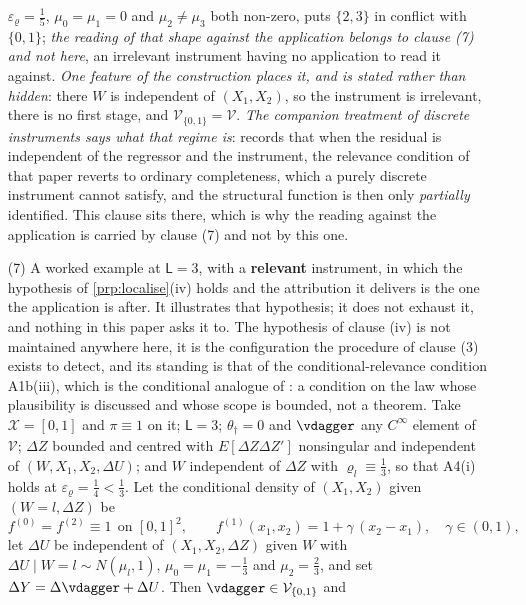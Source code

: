 \begin{remark}
\begin{enumerate}
$\varepsilon_\varrho=\tfrac15$, $\mu_0=\mu_1=0$ and $\mu_2\neq\mu_3$ both non-zero, puts $\{2,3\}$ in
conflict with $\{0,1\}$; \emph{the reading of that shape against the application belongs to clause
\textup{(7)} and not here}, an irrelevant instrument having no application to read it against.
\emph{One feature of the construction places it, and is stated rather than hidden}: there $W$ is
independent of $(X_1,X_2)$, so the instrument is irrelevant, there is no first stage, and
$\mathcal V_{\{0,1\}}=\mathcal V$. \emph{The companion treatment of discrete instruments says what that
regime is}: \citet[Remark~2]{centorrinofeveflorens2019} records that when the residual is independent of
the regressor and the instrument, the relevance condition of that paper reverts to ordinary
completeness, which a purely discrete instrument cannot satisfy, and the structural function is then
only \emph{partially} identified. This clause sits there, which is why the reading against the
application is carried by clause \textup{(7)} and not by this one.
\item[(7)] A worked example at $\mathsf L=3$, with a \textbf{relevant} instrument, in which the
hypothesis of \cref{prp:localise}\textup{(iv)} holds and the attribution it delivers is the one the
application is after. It illustrates that hypothesis; it does not exhaust it, and nothing in this
paper asks it to. The hypothesis of clause \textup{(iv)} is not maintained anywhere here, it is the
configuration the procedure of clause \textup{(3)} exists to detect, and its standing is that of the
conditional-relevance condition A1b(iii), which is the conditional analogue of
\citet[Assumption~2.2]{centorrinofeveflorens2019}: a condition on the law whose plausibility is
discussed and whose scope is bounded, not a theorem. Take
$\mathcal X=[0,1]$ and $\pi\equiv1$ on it; $\mathsf L=3$; $\theta_\dagger=0$ and $\vdagger$ any
$C^{\infty}$ element of $\mathcal V$; $\Delta Z$ bounded and centred with $E[\Delta Z\Delta Z']$
nonsingular and independent of $(W,X_1,X_2,\Delta U)$; and $W$ independent of $\Delta Z$ with
$\varrho_l\equiv\tfrac13$, so that A4(i) holds at $\varepsilon_\varrho=\tfrac14<\tfrac13$. Let the
conditional density of $(X_1,X_2)$ given $(W=l,\Delta Z)$ be
\[
f^{(0)}=f^{(2)}\equiv1\ \ \text{on }[0,1]^{2},
\qquad
f^{(1)}(x_1,x_2)=1+\gamma\,(x_2-x_1),\quad\gamma\in(0,1),
\]
let $\Delta U$ be independent of $(X_1,X_2,\Delta Z)$ given $W$ with
$\Delta U\mid W=l\sim N(\mu_l,1)$, $\mu_0=\mu_1=-\tfrac13$ and $\mu_2=\tfrac23$, and set
$\Delta Y=\Delta\vdagger+\Delta U$. Then $\vdagger\in\mathcal V_{\{0,1\}}$ and

\end{enumerate}
\end{remark}
